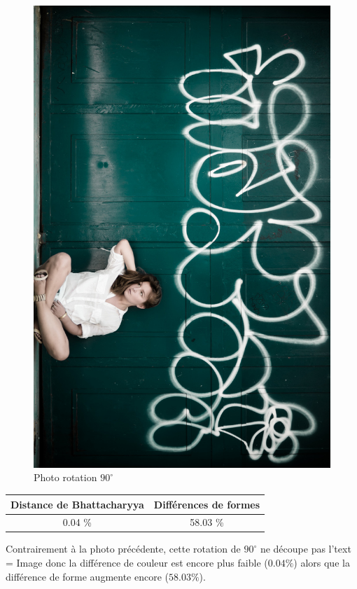 \documentclass[]{article}
\begin{document}
\begin{description}
\begin{figure}[htbp]
\centering
\includegraphics[scale=0.47]{photos/rotation.jpg}
\caption{Photo rotation $90^{\circ}$}
\end{figure}

\begin{center}
\begin{tabular}{|c|c|}
  \hline
  Distance de Bhattacharyya & Différences de formes \\
  \hline
  0.04 \% & 58.03 \% \\
  \hline
\end{tabular}
\end{center}

Contrairement à la photo précédente, cette rotation de $90^{\circ}$ ne
découpe pas l'text = Image donc la différence de couleur est encore plus faible
($0.04 \%$) alors que la différence de forme augmente encore ($58.03 \%$).


\end{description}
\end{document}
